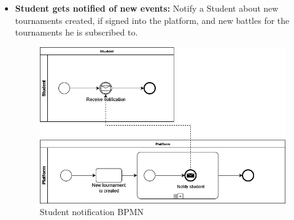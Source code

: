 \documentclass{article}
\begin{document}
{\begin{itemize}
          \newpage

    \item \textbf{Student gets notified of new events:} Notify a Student about new tournaments created, if signed into the platform, 
    and new battles for the tournaments he is subscribed to.
          \begin{figure}[H]
              \centering
              \includegraphics[scale=0.4]{images/BPMN/BPMN5.png}
              \caption{Student notification BPMN}
              \label{fig:studNotificationBPMN}
          \end{figure}


\end{itemize}}
\end{document}
